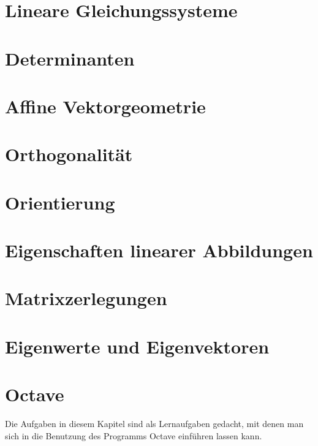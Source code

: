 %
%
%
\chapter{Lineare Gleichungssysteme}

\chapter{Determinanten}

\chapter{Affine Vektorgeometrie}

\chapter{Orthogonalität}

\chapter{Orientierung}

\chapter{Eigenschaften linearer Abbildungen}

\chapter{Matrixzerlegungen}

\chapter{Eigenwerte und Eigenvektoren}

\chapter{Octave}
Die Aufgaben in diesem Kapitel sind als Lernaufgaben gedacht, mit denen
man sich in die Benutzung des Programms Octave einführen lassen kann.

\bigskip

\closethemaindex
\printthemata

